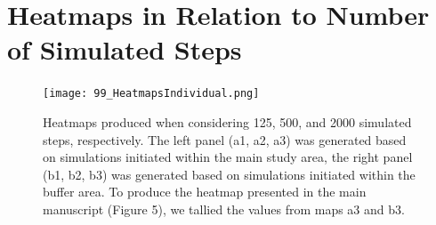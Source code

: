 \documentclass[abstract=off,10pt,a4paper,bibliography=totocnumbered]{article}
\begin{document}
\newpage
{}
\section{Heatmaps in Relation to Number of Simulated Steps}
\begin{figure}[hbtp]
  \begin{center}
    \texttt{[image: 99\_HeatmapsIndividual.png]}
    \caption{Heatmaps produced when considering 125, 500, and 2000 simulated
    steps, respectively. The left panel (a1, a2, a3) was generated based on
    simulations initiated within the main study area, the right panel (b1, b2,
    b3) was generated based on simulations initiated within the buffer area. To
    produce the heatmap presented in the main manuscript (Figure 5), we tallied
    the values from maps a3 and b3.}
    \label{Heatman}
  \end{center}
\end{figure}
\restoregeometry

\newpage
{}
\end{document}
